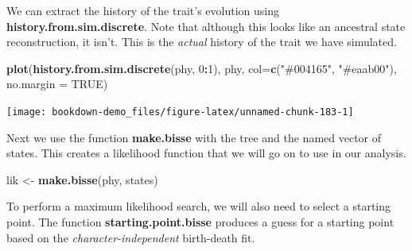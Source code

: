 \documentclass[
]{book}
\newenvironment{Shaded}{\begin{snugshade}}{\end{snugshade}}
\newcommand{\DataTypeTok}[1]{\textcolor[rgb]{0.13,0.29,0.53}{#1}}
\newcommand{\DecValTok}[1]{\textcolor[rgb]{0.00,0.00,0.81}{#1}}
\newcommand{\KeywordTok}[1]{\textcolor[rgb]{0.13,0.29,0.53}{\textbf{#1}}}
\newcommand{\NormalTok}[1]{#1}
\newcommand{\OperatorTok}[1]{\textcolor[rgb]{0.81,0.36,0.00}{\textbf{#1}}}
\newcommand{\OtherTok}[1]{\textcolor[rgb]{0.56,0.35,0.01}{#1}}
\newcommand{\StringTok}[1]{\textcolor[rgb]{0.31,0.60,0.02}{#1}}
\begin{document}
\begin{Shaded}
\end{Shaded}

We can extract the history of the trait's evolution using \textbf{history.from.sim.discrete}. Note that although this looks like an ancestral state reconstruction, it isn't. This is the \emph{actual} history of the trait we have simulated.

\begin{Shaded}
\begin{Highlighting}[]
\KeywordTok{plot}\NormalTok{(}\KeywordTok{history.from.sim.discrete}\NormalTok{(phy, }\DecValTok{0}\OperatorTok{:}\DecValTok{1}\NormalTok{), }
\NormalTok{     phy, }\DataTypeTok{col=}\KeywordTok{c}\NormalTok{(}\StringTok{"\#004165"}\NormalTok{, }\StringTok{"\#eaab00"}\NormalTok{), }\DataTypeTok{no.margin =} \OtherTok{TRUE}\NormalTok{)}
\end{Highlighting}
\end{Shaded}

\begin{center}\texttt{[image: bookdown-demo\_files/figure-latex/unnamed-chunk-183-1]} \end{center}

Next we use the function \textbf{make.bisse} with the tree and the named vector of states. This creates a likelihood function that we will go on to use in our analysis.

\begin{Shaded}
\begin{Highlighting}[]
\NormalTok{lik \textless{}{-}}\StringTok{ }\KeywordTok{make.bisse}\NormalTok{(phy, states)}
\end{Highlighting}
\end{Shaded}

To perform a maximum likelihood search, we will also need to select a starting point. The function \textbf{starting.point.bisse} produces a guess for a starting point based on the \emph{character-independent} birth-death fit.
\end{document}

